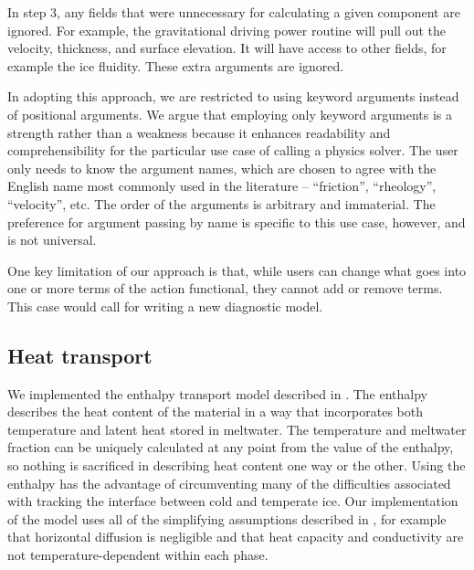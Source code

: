 \documentclass{article}
\theoremstyle{definition}
\theoremstyle{plain}
\begin{document}
In step 3, any fields that were unnecessary for calculating a given component are ignored.
For example, the gravitational driving power routine will pull out the velocity, thickness, and surface elevation.
It will have access to other fields, for example the ice fluidity.
These extra arguments are ignored.

In adopting this approach, we are restricted to using keyword arguments instead of positional arguments.
We argue that employing only keyword arguments is a strength rather than a weakness because it enhances readability and comprehensibility for the particular use case of calling a physics solver.
The user only needs to know the argument names, which are chosen to agree with the English name most commonly used in the literature -- ``friction'', ``rheology'', ``velocity'', etc.
The order of the arguments is arbitrary and immaterial.
The preference for argument passing by name is specific to this use case, however, and is not universal.

One key limitation of our approach is that, while users can change what goes into one or more terms of the action functional, they cannot add or remove terms.
This case would call for writing a new diagnostic model.

\subsection{Heat transport} \label{sec:heat-transport}

We implemented the enthalpy transport model described in \citet{aschwanden2012enthalpy}.
The enthalpy describes the heat content of the material in a way that incorporates both temperature and latent heat stored in meltwater.
The temperature and meltwater fraction can be uniquely calculated at any point from the value of the enthalpy, so nothing is sacrificed in describing heat content one way or the other.
Using the enthalpy has the advantage of circumventing many of the difficulties associated with tracking the interface between cold and temperate ice.
Our implementation of the model uses all of the simplifying assumptions described in \citet{aschwanden2012enthalpy}, for example that horizontal diffusion is negligible and that heat capacity and conductivity are not temperature-dependent within each phase.
\end{document}
